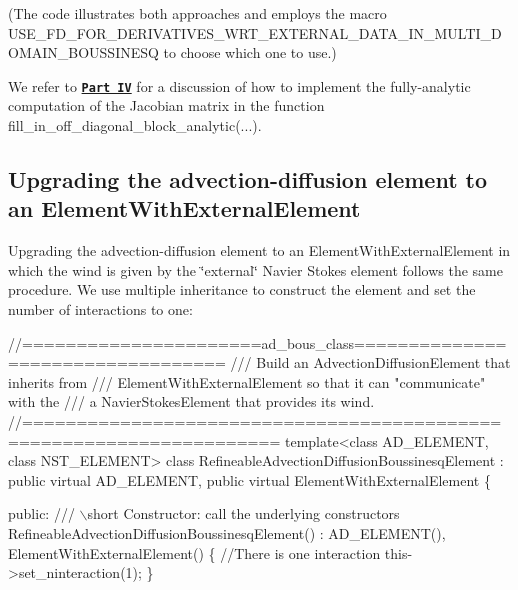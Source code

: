 (The code illustrates both approaches and employs the macro {\ttfamily U\+S\+E\+\_\+\+F\+D\+\_\+\+F\+O\+R\+\_\+\+D\+E\+R\+I\+V\+A\+T\+I\+V\+E\+S\+\_\+\+W\+R\+T\+\_\+\+E\+X\+T\+E\+R\+N\+A\+L\+\_\+\+D\+A\+T\+A\+\_\+\+I\+N\+\_\+\+M\+U\+L\+T\+I\+\_\+\+D\+O\+M\+A\+I\+N\+\_\+\+B\+O\+U\+S\+S\+I\+N\+E\+SQ} to choose which one to use.)

We refer to \href{#optimise}{\tt {\bfseries Part IV}} for a discussion of how to implement the fully-\/analytic computation of the Jacobian matrix in the function {\ttfamily fill\+\_\+in\+\_\+off\+\_\+diagonal\+\_\+block\+\_\+analytic}(...).







\hypertarget{index_ad}{}\subsection{Upgrading the advection-\/diffusion element to an Element\+With\+External\+Element}\label{index_ad}
Upgrading the advection-\/diffusion element to an {\ttfamily Element\+With\+External\+Element} in which the wind is given by the \char`\"{}external\char`\"{} Navier Stokes element follows the same procedure. We use multiple inheritance to construct the element and set the number of interactions to one\+:

 
\begin{DoxyCodeInclude}
\textcolor{comment}{//======================ad\_bous\_class==================================}
\textcolor{comment}{/// Build an AdvectionDiffusionElement that inherits from }
\textcolor{comment}{}\textcolor{comment}{/// ElementWithExternalElement so that it can "communicate" with the }
\textcolor{comment}{}\textcolor{comment}{/// a NavierStokesElement that provides its wind.}
\textcolor{comment}{}\textcolor{comment}{//=====================================================================}
\textcolor{keyword}{template}<\textcolor{keyword}{class} AD\_ELEMENT, \textcolor{keyword}{class} NST\_ELEMENT>
\textcolor{keyword}{class }RefineableAdvectionDiffusionBoussinesqElement : 
\textcolor{keyword}{public} \textcolor{keyword}{virtual} AD\_ELEMENT, \textcolor{keyword}{public} \textcolor{keyword}{virtual} ElementWithExternalElement
\{

\textcolor{keyword}{public}:
\textcolor{comment}{}
\textcolor{comment}{ /// \(\backslash\)short Constructor: call the underlying constructors}
\textcolor{comment}{} RefineableAdvectionDiffusionBoussinesqElement() : 
  AD\_ELEMENT(), ElementWithExternalElement() 
  \{ 
   \textcolor{comment}{//There is one interaction}
   this->set\_ninteraction(1);
  \}

\end{DoxyCodeInclude}


